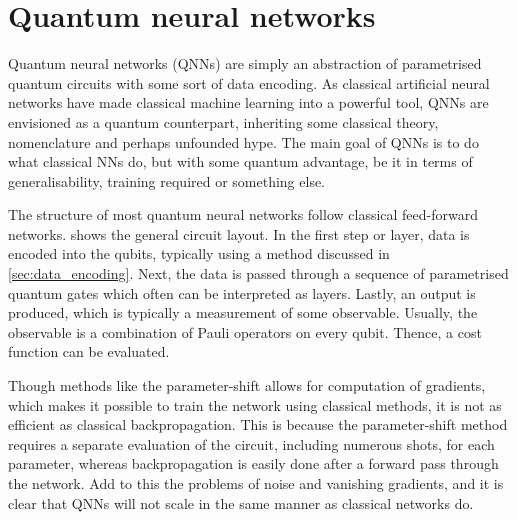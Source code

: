 \section{Quantum neural networks}
Quantum neural networks (QNNs) are simply an abstraction of parametrised quantum circuits with some sort of data encoding.
As classical artificial neural networks have made classical machine learning into a powerful tool, QNNs are envisioned as a quantum counterpart, inheriting some classical theory, nomenclature and perhaps unfounded hype.
The main goal of QNNs is to do what classical NNs do, but with some quantum advantage, be it in terms of generalisability, training required or something else.

The structure of most quantum neural networks follow classical feed-forward networks.
 shows the general circuit layout.
In the first step or layer, data is encoded into the qubits, typically using a method discussed in \cref{sec:data_encoding}.
Next, the data is passed through a sequence of parametrised quantum gates which often can be interpreted as layers.
Lastly, an output is produced, which is typically a measurement of some observable.
Usually, the observable is a combination of Pauli operators on every qubit.
Thence, a cost function can be evaluated.

Though methods like the parameter-shift allows for computation of gradients, which makes it possible to train the network using classical methods, it is not as efficient as classical backpropagation.
This is because the parameter-shift method requires a separate evaluation of the circuit, including numerous shots, for each parameter, whereas backpropagation is easily done after a forward pass through the network.
Add to this the problems of noise and vanishing gradients, and it is clear that QNNs will not scale in the same manner as classical networks do.

